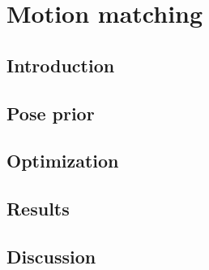 \chapter{Motion matching}

\section{Introduction}

\section{Pose prior}

\section{Optimization}

\section{Results}

\section{Discussion}
